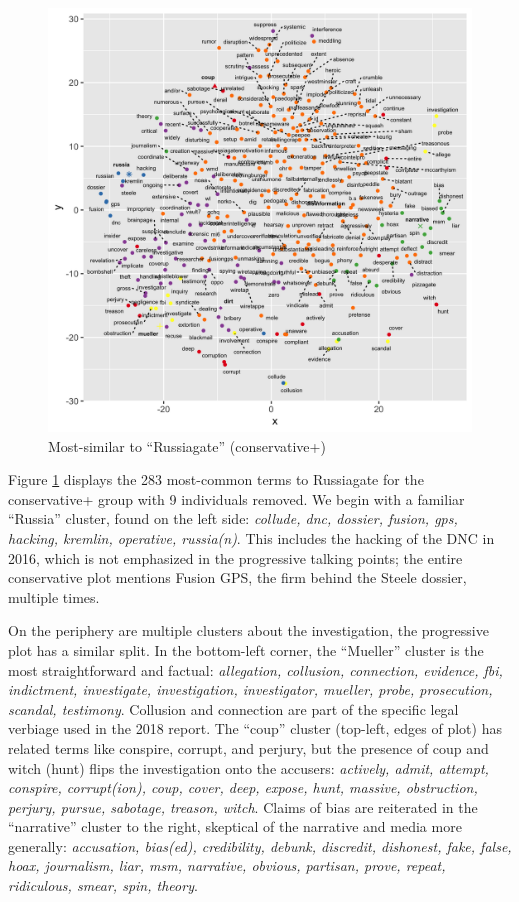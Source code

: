 \documentclass[doublespacing]{utdthesis}
\begin{document}
\begin{figure}[!ht]
\centering
\includegraphics[width=\textwidth]{2016/cons_plus_russiagate}
\caption{Most-similar to ``Russiagate'' (conservative+)}
\label{fig:cons_plus_russiagate}
\end{figure}

Figure \ref{fig:cons_plus_russiagate} displays the 283 most-common terms to Russiagate for the conservative+ group with 9 individuals removed.
We begin with a familiar ``Russia'' cluster, found on the left side: \emph{collude, dnc, dossier, fusion, gps, hacking, kremlin, operative, russia(n)}.
This includes the hacking of the DNC in 2016, which is not emphasized in the progressive talking points; the entire conservative plot mentions Fusion GPS, the firm behind the Steele dossier, multiple times.

On the periphery are multiple clusters about the investigation, the progressive plot has a similar split.
In the bottom-left corner, the ``Mueller'' cluster is the most straightforward and factual: \emph{allegation, collusion, connection, evidence, fbi, indictment, investigate, investigation, investigator, mueller, probe, prosecution, scandal, testimony}.
Collusion and connection are part of the specific legal verbiage used in the 2018 report.
The ``coup'' cluster (top-left, edges of plot) has related terms like conspire, corrupt, and perjury, but the presence of coup and witch (hunt) flips the investigation onto the accusers: \emph{actively, admit, attempt, conspire, corrupt(ion), coup, cover,  deep, expose, hunt, massive, obstruction, perjury, pursue, sabotage, treason, witch}.
Claims of bias are reiterated in the ``narrative'' cluster to the right, skeptical of the narrative and media more generally: \emph{accusation, bias(ed), credibility, debunk, discredit, dishonest, fake, false, hoax, journalism, liar, msm, narrative, obvious, partisan, prove, repeat, ridiculous, smear, spin, theory}.
\end{document}
